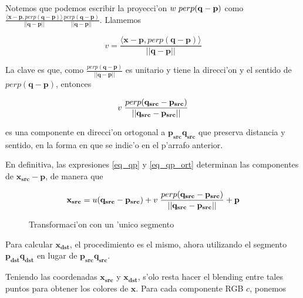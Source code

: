 Notemos que podemos escribir la proyecci'on $w\hspace{0.1cm}perp(\mathbf{q} - \mathbf{p})$ como $\frac{\langle \mathbf{x} - \mathbf{p}, perp(\mathbf{q} - \mathbf{p}) \rangle}{||\mathbf{q} - \mathbf{p}||} \frac{perp(\mathbf{q} - \mathbf{p})}{||\mathbf{q} - \mathbf{p}||}$. Llamemos

\begin{equation}
v = \frac{\langle \mathbf{x} - \mathbf{p}, perp(\mathbf{q} - \mathbf{p}) \rangle}{||\mathbf{q} - \mathbf{p}||}
\label{eq_v_posta}
\end{equation}

\noindent
La clave es que, como $\frac{perp(\mathbf{q} - \mathbf{p})}{||\mathbf{q} - \mathbf{p}||}$ es unitario y tiene la direcci'on y el sentido de $perp(\mathbf{q} - \mathbf{p})$, entonces 

\begin{equation}
v \hspace{0.10cm} \frac{perp(\mathbf{q_{src}} - \mathbf{p_{src}})}{||\mathbf{q_{src}} - \mathbf{p_{src}}||}
\label{eq_qp_ort}
\end{equation}

es una componente en direcci'on ortogonal a $\mathbf{p_{src}q_{src}}$ que preserva distancia y sentido, en la forma en que se indic'o en el p'arrafo anterior.

En definitiva, las expresiones \ref{eq_qp} y \ref{eq_qp_ort} determinan las componentes de $\mathbf{x_{src}} - \mathbf{p}$, de manera que

\begin{equation}
\mathbf{x_{src}} = u (\mathbf{q_{src}} - \mathbf{p_{src}}) + v \hspace{0.10cm} \frac{perp(\mathbf{q_{src}} - \mathbf{p_{src}})}{||\mathbf{q_{src}} - \mathbf{p_{src}}||} + \mathbf{p}
\label{eq_x_posta}
\end{equation}

\begin{figure}[H]
	\begin{center}
	\end{center}		
	\caption{Transformaci'on con un 'unico segmento}
	\label{fig7}
\end{figure}

\noindent
Para calcular $\mathbf{x_{dst}}$, el procedimiento es el mismo, ahora utilizando el segmento $\mathbf{p_{dst}q_{dst}}$ en lugar de $\mathbf{p_{src}q_{src}}$.

Teniendo las coordenadas $\mathbf{x_{src}}$ y $\mathbf{x_{dst}}$, s'olo resta hacer el blending entre tales puntos para obtener los colores de $\mathbf{x}$. Para cada componente RGB $c$, ponemos


